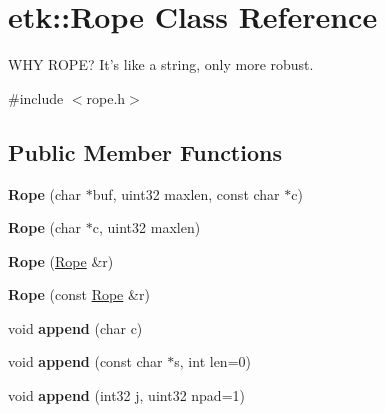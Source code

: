 \hypertarget{classetk_1_1_rope}{\section{etk\-:\-:Rope Class Reference}
\label{classetk_1_1_rope}
}


W\-H\-Y R\-O\-P\-E? It's like a string, only more robust.  




{\ttfamily \#include $<$rope.\-h$>$}

\subsection*{Public Member Functions}
\begin{DoxyCompactItemize}
\item 
\hypertarget{classetk_1_1_rope_a426823083912738084328c12850ee6fd}{{\bfseries Rope} (char $\ast$buf, uint32 maxlen, const char $\ast$c)}\label{classetk_1_1_rope_a426823083912738084328c12850ee6fd}

\item 
\hypertarget{classetk_1_1_rope_aa293e5805ce264f7771e9e3cb50d5df1}{{\bfseries Rope} (char $\ast$c, uint32 maxlen)}\label{classetk_1_1_rope_aa293e5805ce264f7771e9e3cb50d5df1}

\item 
\hypertarget{classetk_1_1_rope_a6ae86cdd3393624aea5f371bc228b498}{{\bfseries Rope} (\hyperlink{classetk_1_1_rope}{Rope} \&r)}\label{classetk_1_1_rope_a6ae86cdd3393624aea5f371bc228b498}

\item 
\hypertarget{classetk_1_1_rope_a544ef8eb56d1a6146758cede8f57574e}{{\bfseries Rope} (const \hyperlink{classetk_1_1_rope}{Rope} \&r)}\label{classetk_1_1_rope_a544ef8eb56d1a6146758cede8f57574e}

\item 
\hypertarget{classetk_1_1_rope_aac9777d9693754133a0f468e2a2dc1a8}{void {\bfseries append} (char c)}\label{classetk_1_1_rope_aac9777d9693754133a0f468e2a2dc1a8}

\item 
\hypertarget{classetk_1_1_rope_aa2afc9a657364e8bdd40776bbe418dac}{void {\bfseries append} (const char $\ast$s, int len=0)}\label{classetk_1_1_rope_aa2afc9a657364e8bdd40776bbe418dac}

\item 
\hypertarget{classetk_1_1_rope_ac2688ed4ef6a9e82d47f05f8e419097f}{void {\bfseries append} (int32 j, uint32 npad=1)}\label{classetk_1_1_rope_ac2688ed4ef6a9e82d47f05f8e419097f}


\end{DoxyCompactItemize}
